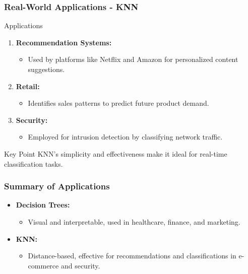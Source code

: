 \documentclass[aspectratio=169]{beamer}
\begin{document}
\begin{frame}[fragile]
    \frametitle{Real-World Applications - KNN}
    
    \begin{block}{Applications}
        \begin{enumerate}
            \item \textbf{Recommendation Systems:}
                \begin{itemize}
                    \item Used by platforms like Netflix and Amazon for personalized content suggestions.
                \end{itemize}
            \item \textbf{Retail:}
                \begin{itemize}
                    \item Identifies sales patterns to predict future product demand.
                \end{itemize}
            \item \textbf{Security:}
                \begin{itemize}
                    \item Employed for intrusion detection by classifying network traffic.
                \end{itemize}
        \end{enumerate}
    \end{block}
    
    \begin{block}{Key Point}
        KNN's simplicity and effectiveness make it ideal for real-time classification tasks.
    \end{block}
\end{frame}

\begin{frame}[fragile]
    \frametitle{Summary of Applications}

    \begin{itemize}
        \item \textbf{Decision Trees:} 
        \begin{itemize}
            \item Visual and interpretable, used in healthcare, finance, and marketing.
        \end{itemize}
        
        \item \textbf{KNN:}
        \begin{itemize}
            \item Distance-based, effective for recommendations and classifications in e-commerce and security.
        \end{itemize}
    \end{itemize}
\end{frame}
\end{document}
